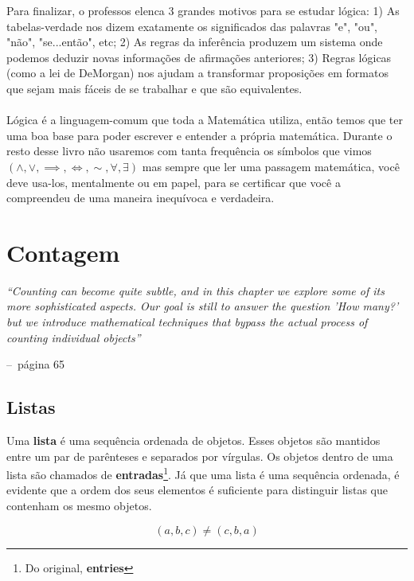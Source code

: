 \documentclass[a4paper,11pt]{book}
\makeatletter
\theoremstyle{definition}
\theoremstyle{break}
\newenvironment{chapquote}[2][2em]
  {\setlength{\@tempdima}{#1}%
   \def\chapquote@author{#2}%
   \parshape 1 \@tempdima \dimexpr\textwidth-2\@tempdima\relax%
   \itshape}
  {\par\normalfont\hfill--\ \chapquote@author\hspace*{\@tempdima}\par\bigskip}
\makeatother
\begin{document}
Para finalizar, o professos elenca 3 grandes motivos para se estudar lógica: 1) As tabelas-verdade nos dizem exatamente os significados das palavras "e", "ou", "não", "se...então", etc; 2) As regras da inferência produzem um sistema onde podemos deduzir novas informações de afirmações anteriores; 3) Regras lógicas (como a lei de DeMorgan) nos ajudam a transformar proposições em formatos que sejam mais fáceis de se trabalhar e que são equivalentes.
\\
\\
Lógica é a linguagem-comum que toda a Matemática utiliza, então temos que ter uma boa base para poder escrever e entender a própria matemática. Durante o resto desse livro não usaremos com tanta frequência os símbolos que vimos $(\land, \lor, \implies, \iff, \sim, \forall, \exists)$ mas sempre que ler uma passagem matemática, você deve usa-los, mentalmente ou em papel, para se certificar que você a compreendeu de uma maneira inequívoca e verdadeira.

\chapter{Contagem}


\begin{chapquote}{página 65}
	``Counting can become quite subtle, and in this chapter we explore some of its more sophisticated aspects. Our goal is still to answer the question 'How many?' but we introduce mathematical techniques that bypass the actual process of counting individual objects''
\end{chapquote}

\section{Listas}

Uma \textbf{lista} é uma sequência ordenada de objetos. Esses objetos são mantidos entre um par de parênteses e separados por vírgulas. Os objetos dentro de uma lista são chamados de \textbf{entradas}\footnote{Do original, \textbf{entries}}. Já que uma lista é uma sequência ordenada, é evidente que a ordem dos seus elementos é suficiente para distinguir listas que contenham os mesmo objetos.

$$ (a,b,c) \neq (c,b,a) $$
\end{document}
